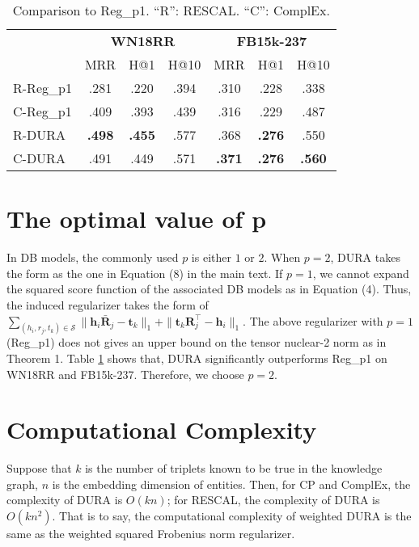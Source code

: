 \documentclass{article}
\begin{document}
\begin{table}[ht]
    \centering
    \caption{Comparison to Reg\_p1. ``R'': RESCAL. ``C'': ComplEx. }    \label{table:cmp_results}
        \vskip 0.1in
        \begin{tabular}{l  c c c  c c c }
            \toprule
              &\multicolumn{3}{c}{\textbf{WN18RR}}&  \multicolumn{3}{c}{\textbf{FB15k-237}} \\
             \cmidrule(lr){2-4}
             \cmidrule(lr){5-7}
             & MRR & H@1 & H@10 & MRR & H@1 & H@10 \\
            \midrule
            R-Reg\_p1   &.281 &.220 &.394 &.310 &.228 &.338\\
            C-Reg\_p1   &.409 &.393 &.439 &.316 &.229 &.487\\
            \midrule
            R-DURA    &\textbf{.498} &\textbf{.455} &.577 &.368 &\textbf{.276} &.550 \\
            C-DURA &.491 &.449 &.571 &\textbf{.371} &\textbf{.276} &\textbf{.560} \\
            \bottomrule
        \end{tabular}
\end{table}

\section{The optimal value of p}
In DB models, the commonly used $p$ is either $1$ or $2$. When $p=2$, DURA takes the form as the one in Equation (8) in the main text. If $p=1$, we cannot expand the squared score function of the associated DB models as in Equation (4).
Thus, the induced regularizer takes the form of $\sum_{(h_i,r_j,t_k)\in\mathcal{S}}\|\textbf{h}_i\bar{\textbf{R}}_j-\textbf{t}_k\|_1+\|\textbf{t}_k\textbf{R}_j^\top-\textbf{h}_i\|_1$. The above regularizer with $p=1$ (Reg\_p1) does not gives an upper bound on the tensor nuclear-2 norm as in Theorem 1. Table \ref{table:cmp_results} shows that, DURA significantly outperforms Reg\_p1 on WN18RR and FB15k-237. Therefore, we choose $p=2$.

\section{Computational Complexity}
Suppose that $k$ is the number of triplets known to be true in the knowledge graph, $n$ is the embedding dimension of entities. Then, for CP and ComplEx, the complexity of DURA is $O(kn)$; for RESCAL, the complexity of DURA is $O(kn^2)$. That is to say, the computational complexity of weighted DURA is the same as the weighted squared Frobenius norm regularizer. 
\end{document}
